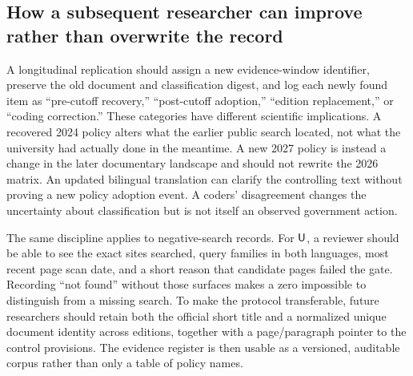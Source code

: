 \subsection{How a subsequent researcher can improve rather than overwrite the record}
A longitudinal replication should assign a new evidence-window identifier, preserve the old document and classification digest, and log each newly found item as ``pre-cutoff recovery,'' ``post-cutoff adoption,'' ``edition replacement,'' or ``coding correction.'' These categories have different scientific implications. A recovered 2024 policy alters what the earlier public search located, not what the university had actually done in the meantime. A new 2027 policy is instead a change in the later documentary landscape and should not rewrite the 2026 matrix. An updated bilingual translation can clarify the controlling text without proving a new policy adoption event. A coders' disagreement changes the uncertainty about classification but is not itself an observed government action.

The same discipline applies to negative-search records. For $\textsf{U}$, a reviewer should be able to see the exact sites searched, query families in both languages, most recent page scan date, and a short reason that candidate pages failed the gate. Recording ``not found'' without those surfaces makes a zero impossible to distinguish from a missing search. To make the protocol transferable, future researchers should retain both the official short title and a normalized unique document identity across editions, together with a page/paragraph pointer to the control provisions. The evidence register is then usable as a versioned, auditable corpus rather than only a table of policy names.
